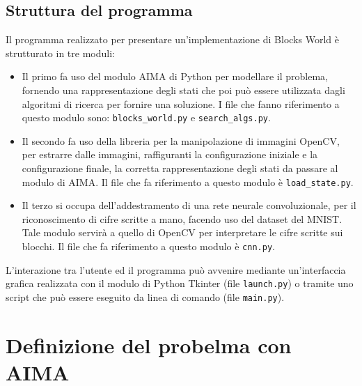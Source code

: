 \documentclass{article}
\begin{document}
	\subsection{Struttura del programma}
	Il programma realizzato per presentare un'implementazione di Blocks World è strutturato in tre moduli:
	\begin{itemize}
		\item Il primo fa uso del modulo AIMA di Python per modellare il problema, fornendo una rappresentazione degli stati che poi può essere utilizzata dagli algoritmi di ricerca per fornire una soluzione. I file che fanno riferimento a questo modulo sono: \verb*|blocks_world.py| e \verb*|search_algs.py|.
		\item Il secondo fa uso della libreria per la manipolazione di immagini OpenCV, per estrarre dalle immagini, raffiguranti la configurazione iniziale e la configurazione finale, la corretta rappresentazione degli stati da passare al modulo di AIMA. Il file che fa riferimento a questo modulo è \verb*|load_state.py|.
		\item Il terzo si occupa dell'addestramento di una rete neurale convoluzionale, per il riconoscimento di cifre scritte a mano, facendo uso del dataset del MNIST. Tale modulo servirà a quello di OpenCV per interpretare le cifre scritte sui blocchi. Il file che fa riferimento a questo modulo è \verb*|cnn.py|.
	\end{itemize}
	L'interazione tra l'utente ed il programma può avvenire mediante un'interfaccia grafica realizzata con il modulo di Python Tkinter (file \verb*|launch.py|) o tramite uno script che può essere eseguito da linea di comando (file \verb*|main.py|).

	\section{Definizione del probelma con AIMA}
\end{document}
